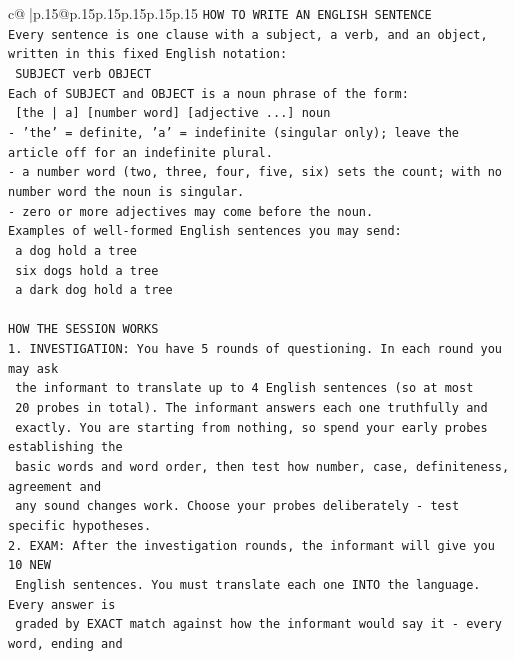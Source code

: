 \documentclass{article}
\begin{document}
{\begin{supertabular}{c@{$\;$}|p{.15\linewidth}@{}p{.15\linewidth}p{.15\linewidth}p{.15\linewidth}p{.15\linewidth}p{.15\linewidth}}
{{{\texttt{HOW TO WRITE AN ENGLISH SENTENCE} \\
\texttt{Every sentence is one clause with a subject, a verb, and an object, written in this fixed English notation:} \\
\texttt{    SUBJECT  verb  OBJECT} \\
\texttt{Each of SUBJECT and OBJECT is a noun phrase of the form:} \\
\texttt{    {[}the | a{]}  {[}number word{]}  {[}adjective ...{]}  noun} \\
\texttt{{-} 'the' = definite, 'a' = indefinite (singular only); leave the article off for an indefinite plural.} \\
\texttt{{-} a number word (two, three, four, five, six) sets the count; with no number word the noun is singular.} \\
\texttt{{-} zero or more adjectives may come before the noun.} \\
\texttt{Examples of well{-}formed English sentences you may send:} \\
\texttt{    a dog hold a tree} \\
\texttt{    six dogs hold a tree} \\
\texttt{    a dark dog hold a tree} \\
\\ 
\texttt{HOW THE SESSION WORKS} \\
\texttt{1. INVESTIGATION: You have 5 rounds of questioning. In each round you may ask} \\
\texttt{   the informant to translate up to 4 English sentences (so at most} \\
\texttt{   20 probes in total). The informant answers each one truthfully and} \\
\texttt{   exactly. You are starting from nothing, so spend your early probes establishing the} \\
\texttt{   basic words and word order, then test how number, case, definiteness, agreement and} \\
\texttt{   any sound changes work. Choose your probes deliberately {-} test specific hypotheses.} \\
\texttt{2. EXAM: After the investigation rounds, the informant will give you 10 NEW} \\
\texttt{   English sentences. You must translate each one INTO the language. Every answer is} \\
\texttt{   graded by EXACT match against how the informant would say it {-} every word, ending and} \\
}}}
\end{supertabular}}
\end{document}
